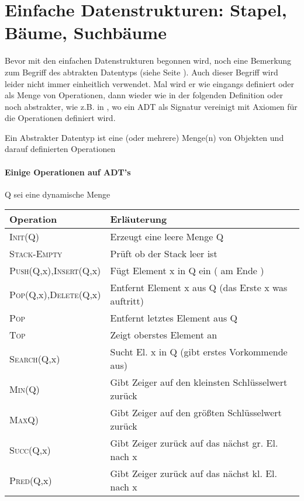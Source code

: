   \chapter{Einfache Datenstrukturen: Stapel, Bäume, Suchbäume}
  Bevor mit den einfachen Datenstrukturen begonnen wird,
  noch eine Bemerkung zum Begriff des abtrakten Datentyps (siehe Seite \pageref{ADT}).
  Auch dieser Begriff wird leider nicht immer einheitlich verwendet. Mal wird er wie eingangs definiert oder als Menge von Operationen,
  dann wieder wie in der
  folgenden Definition oder noch abstrakter, wie z.B. in \cite{guting}, wo ein ADT als Signatur vereinigt mit Axiomen für die
  Operationen definiert wird.

  \begin{definition}[ADT]
    Ein Abstrakter Datentyp ist eine (oder mehrere) Menge(n) von Objekten und
    darauf definierten Operationen
  \end{definition}

  \subsubsection{Einige Operationen auf ADT's}
  \begin{description}
  \item Q sei eine dynamische Menge
   
   \begin{tabular}[t]{@{}ll@{}} %
      Operation & Erläuterung \\
      \hline
      \textsc{Init}(Q) & Erzeugt eine leere Menge Q \\
      \textsc{Stack-Empty} & Prüft ob der Stack leer ist \\
      \textsc{Push}(Q,x),\textsc{Insert}(Q,x) & Fügt Element x in Q ein ( am Ende ) \\
      \textsc{Pop}(Q,x),\textsc{Delete}(Q,x) & Entfernt Element x aus Q (das Erste x was auftritt)\\
      \textsc{Pop} & Entfernt letztes Element aus Q\\
      \textsc{Top} & Zeigt oberstes Element an \\
      \textsc{Search}(Q,x) & Sucht El. x in Q (gibt erstes Vorkommende aus)\\
      \textsc{Min}(Q) & Gibt Zeiger auf den kleinsten Schlüsselwert zurück \\
      \textsc{Max}Q) & Gibt Zeiger auf den größten Schlüsselwert zurück \\
      \textsc{Succ}(Q,x) & Gibt Zeiger zurück auf das nächst gr. El. nach x\\
      \textsc{Pred}(Q,x) & Gibt Zeiger zurück auf das nächst kl. El. nach x 
   \end{tabular}
    
  \end{description}


